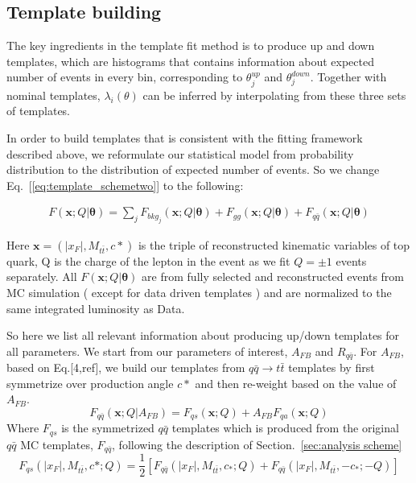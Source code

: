 \subsection{Template building}
The key ingredients in the template fit method is to produce up and down templates, which are histograms that contains information about expected number of events in every bin, corresponding to $\theta_j^{up}$ and $\theta_j^{down}$. Together with nominal templates, $\lambda_i(\theta)$ can be inferred by interpolating from these three sets of templates. 

In order to build templates that is consistent with the fitting framework described above, we reformulate our statistical model from  probability distribution to the distribution of expected number of events. So we change Eq.~[\ref{eq:template_schemetwo}] to the following:

\begin{align}
F(\bm{x};Q|\bm{\theta}) = \sum_j F_{bkg_j}(\bm{x};Q|\bm{\theta})+F_{gg}(\bm{x};Q|\bm{\theta})+F_{q\bar{q}}(\bm{x};Q|\bm{\theta})
\end{align}

Here $\bm{x}=(|x_{F}|,M_{t\bar{t}},c*)$ is the triple of reconstructed kinematic variables of top quark, Q is the charge of the lepton in the event as we fit $Q=\pm1$ events separately. All $F(\bm{x};Q|\bm{\theta})$ are from fully selected and reconstructed events from MC simulation ( except for data driven templates ) and are normalized to the same integrated luminosity as Data.

So here we list all relevant information about producing up/down templates for all parameters. We start from our parameters of interest, $A_{FB}$ and $R_{q\bar{q}}$. For $A_{FB}$, based on Eq.[4,ref], we build our templates from $q\bar{q}\rightarrow t\bar{t}$ templates by first symmetrize over production angle $c*$ and then re-weight based on the value of $A_{FB}$. 
\begin{equation}
\label{eq:Fqq_AFB}
F_{q\bar{q}}(\bm{x};Q|A_{FB}) = F_{qs}(\bm{x};Q)+ A_{FB} F_{qa}(\bm{x};Q)
\end{equation}
Where $F_{qs}$ is the symmetrized $q\bar{q}$ templates which is produced from the original $q\bar{q}$ MC templates, $F_{q\bar{q}}$, following the description of Section.~\ref{sec:analysis scheme}
\begin{equation}
F_{qs}(|x_F|,M_{t\bar{t}},c*;Q) = \frac{1}{2}\left[ F_{q\bar{q}}(|x_F|,M_{t\bar{t}},c_*;Q)+F_{q\bar{q}}(|x_F|,M_{t\bar{t}},-c_*;-Q)\right]
\end{equation}

